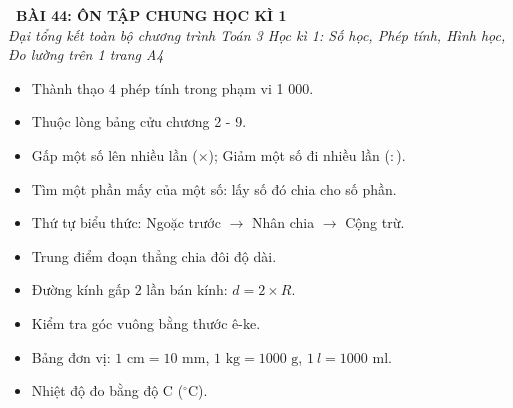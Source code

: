 \documentclass[11pt,a4paper]{article}
\begin{document}
\begin{tcolorbox}[
  enhanced,
  colback=white,
  colframe=primary,
  arc=3mm,
  boxrule=1.2pt,
  left=4mm, right=4mm, top=2.5mm, bottom=2.5mm,
  drop shadow=black!10!white
]
  \centering
  {\Large\bfseries\color{primary}\faBookmark\ BÀI 44: ÔN TẬP CHUNG HỌC KÌ 1}\\[1.5mm]
  {\small\itshape\color{black!75}Đại tổng kết toàn bộ chương trình Toán 3 Học kì 1: Số học, Phép tính, Hình học, Đo lường trên 1 trang A4}
\end{tcolorbox}

\vspace{-2mm}


\noindent
\begin{minipage}[t]{0.49\textwidth}\vspace{0pt}
\begin{tcolorbox}[
  enhanced,
  colback=blue!4!white,
  colframe=blue!75!black,
  arc=2mm, boxrule=0.8pt,
  left=2mm, right=2mm, top=1.8mm, bottom=1.8mm,
  title={\footnotesize\bfseries\color{white}\faCalculator\ 1. Mạch Số học \& Phép tính HK1}
]
{\footnotesize
\begin{itemize}\setlength{\itemsep}{1.5pt}\setlength{\leftskip}{-2.5mm}
  \item Thành thạo 4 phép tính trong phạm vi 1 000.
  \item Thuộc lòng bảng cửu chương 2 - 9.
  \item Gấp một số lên nhiều lần ($\times$); Giảm một số đi nhiều lần ($:$).
  \item Tìm một phần mấy của một số: lấy số đó chia cho số phần.
  \item Thứ tự biểu thức: Ngoặc trước $\to$ Nhân chia $\to$ Cộng trừ.
\end{itemize}
}
\end{tcolorbox}
\end{minipage}
\hfill
\begin{minipage}[t]{0.49\textwidth}\vspace{0pt}
\begin{tcolorbox}[
  enhanced,
  colback=teal!4!white,
  colframe=teal!75!black,
  arc=2mm, boxrule=0.8pt,
  left=2mm, right=2mm, top=1.8mm, bottom=1.8mm,
  title={\footnotesize\bfseries\color{white}\faSliders\ 2. Mạch Hình học \& Đo lường HK1}
]
{\footnotesize
\begin{itemize}\setlength{\itemsep}{1.5pt}\setlength{\leftskip}{-2.5mm}
  \item Trung điểm đoạn thẳng chia đôi độ dài.
  \item Đường kính gấp $2$ lần bán kính: $d = 2 \times R$.
  \item Kiểm tra góc vuông bằng thước ê-ke.
  \item Bảng đơn vị: $1\text{ cm} = 10\text{ mm}$, $1\text{ kg} = 1000\text{ g}$, $1\ l = 1000\text{ ml}$.
  \item Nhiệt độ đo bằng độ C ($^\circ\text{C}$).
\end{itemize}
}
\end{tcolorbox}
\end{minipage}
\end{document}
